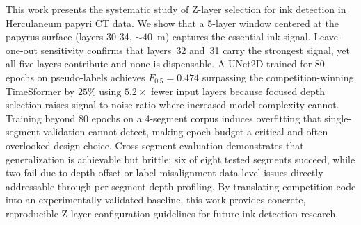 This work presents the systematic study of Z-layer selection for ink detection in Herculaneum papyri CT data. We show that a 5-layer window centered at the papyrus surface (layers 30-34, ${\sim}40$~\textmu m) captures the essential ink signal. Leave-one-out sensitivity confirms that layers~32 and~31 carry the strongest signal, yet all five layers contribute and none is dispensable. A UNet2D trained for 80 epochs on pseudo-labels achieves $F_{0.5} = 0.474$ surpassing the competition-winning TimeSformer by $25\%$ using $5.2{\times}$ fewer input layers because focused depth selection raises signal-to-noise ratio where increased model complexity cannot. Training beyond 80 epochs on a 4-segment corpus induces overfitting that single-segment validation cannot detect, making epoch budget a critical and often overlooked design choice. Cross-segment evaluation demonstrates that generalization is achievable but brittle: six of eight tested segments succeed, while two fail due to depth offset or label misalignment data-level issues directly addressable through per-segment depth profiling. By translating competition code into an experimentally validated baseline, this work provides concrete, reproducible Z-layer configuration guidelines for future ink detection research.
